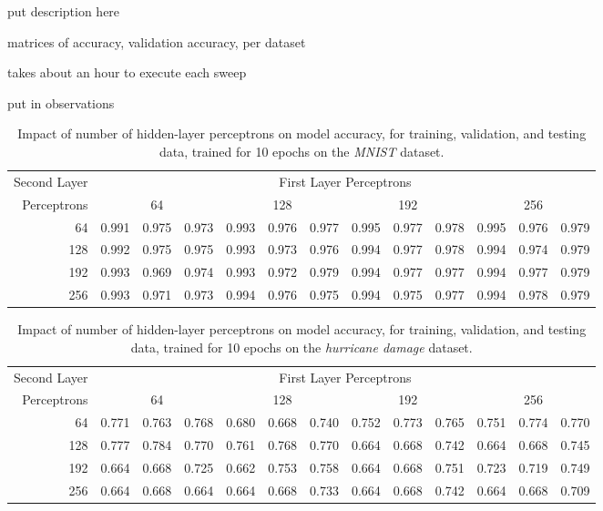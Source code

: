 \documentclass{article}
\begin{document}
put description here

matrices of accuracy, validation accuracy, per dataset

takes about an hour to execute each sweep

put in observations

\begin{table}[h!]
	\centering
	\caption{Impact of number of hidden-layer perceptrons on model accuracy, for training, validation, and testing data, trained for 10 epochs on the \emph{MNIST} dataset.}
	\label{tbl:m-2l}
	\begin{tabular}{r|ccc|ccc|ccc|ccc}
		Second Layer & \multicolumn{12}{c}{First Layer Perceptrons} \\
		Perceptrons & \multicolumn{3}{c}{64} & \multicolumn{3}{c}{128} & \multicolumn{3}{c}{192} & \multicolumn{3}{c}{256} \\
		\hline
		64 & 0.991 & 0.975 & 0.973 & 0.993 & 0.976 & 0.977 & 0.995 & 0.977 & 0.978 & 0.995 & 0.976 & 0.979 \\
		128 & 0.992 & 0.975 & 0.975 & 0.993 & 0.973 & 0.976 & 0.994 & 0.977 & 0.978 & 0.994 & 0.974 & 0.979 \\
		192 & 0.993 & 0.969 & 0.974 & 0.993 & 0.972 & 0.979 & 0.994 & 0.977 & 0.977 & 0.994 & 0.977 & 0.979 \\
		256 & 0.993 & 0.971 & 0.973 & 0.994 & 0.976 & 0.975 & 0.994 & 0.975 & 0.977 & 0.994 & 0.978 & 0.979
	\end{tabular}
\end{table}

\begin{table}[h!]
	\centering
	\caption{Impact of number of hidden-layer perceptrons on model accuracy, for training, validation, and testing data, trained for 10 epochs on the \emph{hurricane damage} dataset.}
	\label{tbl:h-2l}
	\begin{tabular}{r|ccc|ccc|ccc|ccc}
		Second Layer & \multicolumn{12}{c}{First Layer Perceptrons} \\
		Perceptrons & \multicolumn{3}{c}{64} & \multicolumn{3}{c}{128} & \multicolumn{3}{c}{192} & \multicolumn{3}{c}{256} \\
		\hline
		64 & 0.771 & 0.763 & 0.768 & 0.680 & 0.668 & 0.740 & 0.752 & 0.773 & 0.765 & 0.751 & 0.774 & 0.770 \\
		128 & 0.777 & 0.784 & 0.770 & 0.761 & 0.768 & 0.770 & 0.664 & 0.668 & 0.742 & 0.664 & 0.668 & 0.745 \\
		192 & 0.664 & 0.668 & 0.725 & 0.662 & 0.753 & 0.758 & 0.664 & 0.668 & 0.751 & 0.723 & 0.719 & 0.749 \\
		256 & 0.664 & 0.668 & 0.664 & 0.664 & 0.668 & 0.733 & 0.664 & 0.668 & 0.742 & 0.664 & 0.668 & 0.709
	\end{tabular}
\end{table}
\end{document}
